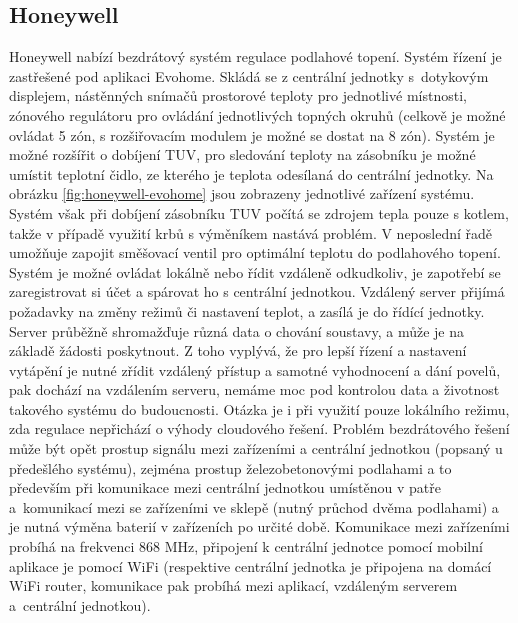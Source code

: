 \subsection{Honeywell}
Honeywell nabízí bezdrátový systém regulace podlahové topení. Systém řízení je zastřešené pod aplikaci Evohome. Skládá se z centrální jednotky s~dotykovým displejem, nástěnných snímačů prostorové teploty pro jednotlivé místnosti, zónového regulátoru pro ovládání jednotlivých topných okruhů (celkově je možné ovládat 5 zón, s rozšiřovacím modulem je možné se dostat na 8 zón). Systém je možné rozšířit o dobíjení TUV, pro sledování teploty na zásobníku je možné umístit teplotní čidlo, ze kterého je teplota odesílaná do centrální jednotky. Na obrázku \ref{fig:honeywell-evohome} jsou zobrazeny jednotlivé zařízení systému. Systém však při dobíjení zásobníku TUV počítá se zdrojem tepla pouze s kotlem, takže v případě využití krbů s výměníkem nastává problém. V neposlední řadě umožňuje zapojit směšovací ventil pro optimální teplotu do podlahového topení. Systém je možné ovládat lokálně nebo řídit vzdáleně odkudkoliv, je zapotřebí se zaregistrovat si účet a spárovat ho s  centrální jednotkou. Vzdálený server přijímá požadavky na změny režimů či nastavení teplot, a zasílá je do řídící jednotky. Server průběžně shromažďuje různá data o chování soustavy, a může je na základě žádosti poskytnout. Z toho vyplývá, že pro lepší řízení a nastavení vytápění je nutné zřídit vzdálený přístup a samotné vyhodnocení a dání povelů, pak dochází na vzdálením serveru, nemáme moc pod kontrolou data a životnost takového systému do budoucnosti. Otázka je i při využití pouze lokálního režimu, zda regulace nepřichází o výhody cloudového řešení. Problém bezdrátového řešení může být opět prostup signálu mezi zařízeními a centrální jednotkou (popsaný u předešlého systému), zejména prostup železobetonovými podlahami a to především při komunikace mezi centrální jednotkou umístěnou v patře a~komunikací mezi se zařízeními ve sklepě (nutný průchod dvěma podlahami) a je nutná výměna baterií v zařízeních po určité době. Komunikace mezi zařízeními probíhá na frekvenci 868 MHz, připojení k centrální jednotce pomocí mobilní aplikace je pomocí WiFi (respektive centrální jednotka je připojena na domácí WiFi router, komunikace pak probíhá mezi aplikací, vzdáleným serverem a~centrální jednotkou).

